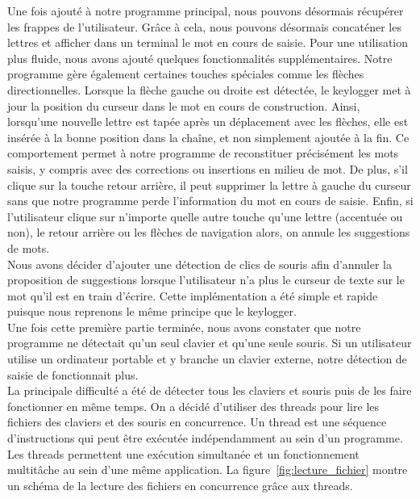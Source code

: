 \documentclass[a4paper, 11pt]{report}
\begin{document}
{Une fois ajouté à notre programme principal, nous pouvons désormais récupérer les frappes de l'utilisateur. Grâce à cela, nous pouvons désormais concaténer les lettres et afficher dans un terminal le mot en cours de saisie. Pour une utilisation plus fluide, nous avons ajouté quelques fonctionnalités supplémentaires. Notre programme gère également certaines touches spéciales comme les flèches directionnelles. Lorsque la flèche gauche ou droite est détectée, le keylogger met à jour la position du curseur dans le mot en cours de construction. Ainsi, lorsqu’une nouvelle lettre est tapée après un déplacement avec les flèches, elle est insérée à la bonne position dans la chaîne, et non simplement ajoutée à la fin. Ce comportement permet à notre programme de reconstituer précisément les mots saisis, y compris avec des corrections ou insertions en milieu de mot. De plus, s'il clique sur la touche retour arrière, il peut supprimer la lettre à gauche du curseur sans que notre programme perde l'information du mot en cours de saisie. Enfin, si l'utilisateur clique sur n'importe quelle autre touche qu'une lettre (accentuée ou non), le retour arrière ou les flèches de navigation alors, on annule les suggestions de mots. \\

Nous avons décider d'ajouter une détection de clics de souris afin d'annuler la proposition de suggestions lorsque l'utilisateur n'a plus le curseur de texte sur le mot qu'il est en train d'écrire. Cette implémentation a été simple et rapide puisque nous reprenons le même principe que le keylogger. \\

Une fois cette première partie terminée, nous avons constater que notre programme ne détectait qu'un seul clavier et qu'une seule souris. Si un utilisateur utilise un ordinateur portable et y branche un clavier externe, notre détection de saisie de fonctionnait plus. \\

La principale difficulté a été de détecter tous les claviers et souris puis de les faire fonctionner en même temps. On a décidé d'utiliser des threads pour lire les fichiers des claviers et des souris en concurrence. Un thread est une séquence d'instructions qui peut être exécutée indépendamment au sein d'un programme. Les threads permettent une exécution simultanée et un fonctionnement multitâche au sein d'une même application. La figure~\ref{fig:lecture_fichier} montre un schéma de la lecture des fichiers en concurrence grâce aux threads.

}
\end{document}
